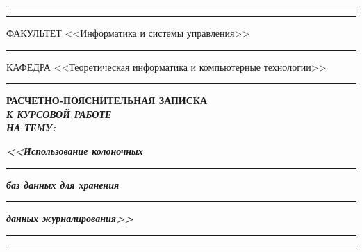 \documentclass[14pt, russian]{scrartcl}
\begin{document}
\begin{titlepage}
	\vspace{-2pt}
	\hspace{-34.5pt}\rule{\textwidth}{2.5pt}

	\vspace*{-20.3pt}
	\hspace{-34.5pt}\rule{\textwidth}{0.4pt}

	\vspace{0.5ex}
	\noindent \small ФАКУЛЬТЕТ\hspace{80pt} <<Информатика и системы управления>>

	\vspace*{-16pt}
	\hspace{35pt}\rule{0.855\textwidth}{0.4pt}

	\vspace{0.5ex}
	\noindent \small КАФЕДРА\hspace{50pt} <<Теоретическая информатика и компьютерные технологии>>

	\vspace*{-16pt}
	\hspace{25pt}\rule{0.875\textwidth}{0.4pt}


	\vspace{3em}

	\begin{center}
		\Large \bf{РАСЧЕТНО-ПОЯСНИТЕЛЬНАЯ ЗАПИСКА\\\textbf{\textit{К КУРСОВОЙ РАБОТЕ\\НА ТЕМУ:}} \\}
	\end{center}

	\vspace*{-6ex}
	\begin{center}
		\Large{\textit{\textbf{<<Использование колоночных
				}}}

		\vspace*{-3ex}
		\rule{0.9\textwidth}{1.2pt}

		\vspace*{-0.2ex}
		\Large{\textit{\textbf{баз данных для хранения}}}
		\vspace*{-3ex}


		\vspace*{-0.2ex}
		\rule{0.9\textwidth}{1.2pt}

		\Large{\textit{\textbf{данных журналирования>>}}}

		\vspace*{-3ex}
		\vspace*{-0.2ex}
		\rule{0.9\textwidth}{1.2pt}

		\vspace*{-0.2ex}
		\rule{0.9\textwidth}{1.2pt}


\end{center}
\end{titlepage}
\end{document}
